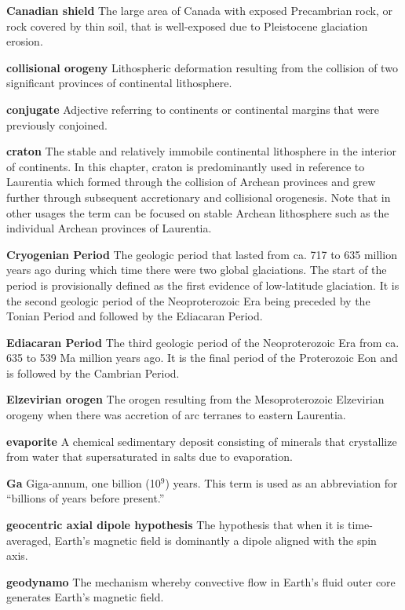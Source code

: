 \documentclass[twocolumn, switch]{article} %
\begin{document}
\noindent\textbf{Canadian shield } The large area of Canada with exposed Precambrian rock, or rock covered by thin soil, that is well-exposed due to Pleistocene glaciation erosion.

\noindent\textbf{collisional orogeny } Lithospheric deformation resulting from the collision of two significant provinces of continental lithosphere.

\noindent\textbf{conjugate } Adjective referring to continents or continental margins that were previously conjoined.

\noindent\textbf{craton } The stable and relatively immobile continental lithosphere in the interior of continents. In this chapter, craton is predominantly used in reference to Laurentia which formed through the collision of Archean provinces and grew further through subsequent accretionary and collisional orogenesis. Note that in other usages the term can be focused on stable Archean lithosphere such as the individual Archean provinces of Laurentia.

\noindent\textbf{Cryogenian Period } The geologic period that lasted from ca. 717 to 635 million years ago during which time there were two global glaciations. The start of the period is provisionally defined as the first evidence of low-latitude glaciation. It is the second geologic period of the Neoproterozoic Era being preceded by the Tonian Period and followed by the Ediacaran Period.

\noindent\textbf{Ediacaran Period } The third geologic period of the Neoproterozoic Era from ca. 635 to 539 Ma million years ago. It is the final period of the Proterozoic Eon and is followed by the Cambrian Period.

\noindent\textbf{Elzevirian orogen } The orogen resulting from the Mesoproterozoic Elzevirian orogeny when there was accretion of arc terranes to eastern Laurentia.

\noindent\textbf{evaporite } A chemical sedimentary deposit consisting of minerals that crystallize from water that supersaturated in salts due to evaporation.

\noindent\textbf{Ga } Giga-annum, one billion (10$^9$) years. This term is used as an abbreviation for ``billions of years before present.''

\noindent\textbf{geocentric axial dipole hypothesis } The hypothesis that when it is time-averaged, Earth's magnetic field is dominantly a dipole aligned with the spin axis. 

\noindent\textbf{geodynamo } The mechanism whereby convective flow in Earth's fluid outer core generates Earth's magnetic field.
\end{document}
